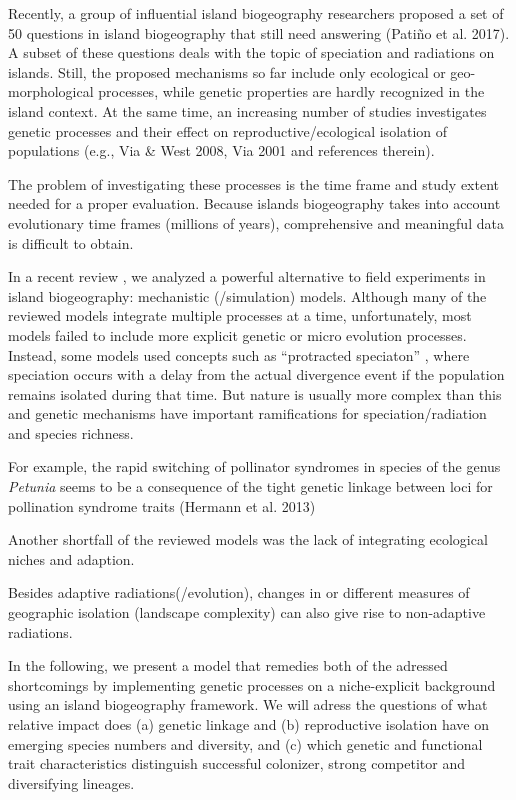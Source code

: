 \documentclass[a4paper]{scrartcl}
\begin{document}
Recently, a group of influential island biogeography researchers proposed a set of 50 questions in island biogeography that still need answering (Patiño et al. 2017).
A subset of these questions deals with the topic of speciation and radiations on islands.
Still, the proposed mechanisms so far include only ecological or geo-morphological processes,
while genetic properties are hardly recognized in the island context.
At the same time, an increasing number of studies investigates genetic processes and
their effect on reproductive/ecological isolation of populations (e.g., Via \& West 2008, Via 2001 and references therein).

The problem of investigating these processes is the time frame and study extent needed for a proper evaluation.
Because islands biogeography takes into account evolutionary time frames (millions of years),
comprehensive and meaningful data is difficult to obtain.

In a recent review \cite{leidinger2017biodiversity}, we analyzed a powerful alternative to field experiments in island biogeography: mechanistic (/simulation) models.
Although many of the reviewed models integrate multiple processes at a time, unfortunately, most models failed to include more explicit genetic or micro evolution processes.
Instead, some models used concepts such as ``protracted speciaton'' \cite{rosindellXXX},
where speciation occurs with a delay from the actual
divergence event if the population remains isolated during that time.
But nature is usually more complex than this and genetic mechanisms have important ramifications for speciation/radiation and species richness.


For example, the rapid switching of pollinator syndromes in species of the genus \textit{Petunia} %
seems to be a consequence of the tight genetic linkage between loci for pollination syndrome traits (Hermann et al. 2013) %

Another shortfall of the reviewed models was the lack of integrating ecological niches and adaption.

Besides adaptive radiations(/evolution), changes in or different measures of geographic isolation (landscape complexity) can also give rise to non-adaptive radiations.

In the following, we present a model that remedies both of the adressed shortcomings
by implementing genetic processes on a niche-explicit background
using an island biogeography framework.
We will adress the questions of what relative impact does (a) genetic linkage and
(b) reproductive isolation have on emerging species numbers and diversity,
and (c) which genetic and functional trait characteristics distinguish successful colonizer,
strong competitor and diversifying lineages.
\end{document}

